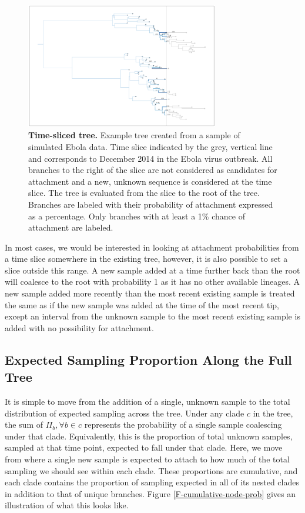 \documentclass[11pt,oneside,letterpaper]{article}
\newcommand\tab[1][1cm]{\hspace*{#1}}
\begin{document}
\begin{figure}[h]
 \centering
	\includegraphics[width=0.75\textwidth]{figures/time-slice}
	\caption{\textbf{Time-sliced tree.}
	Example tree created from a sample of simulated Ebola data. Time slice indicated by the grey, vertical line and corresponds to December 2014 in the Ebola virus outbreak. All branches to the right of the slice are not considered as candidates for attachment and a new, unknown sequence is considered at the time slice. The tree is evaluated from the slice to the root of the tree. Branches are labeled with their probability of attachment expressed as a percentage. Only branches with at least a 1\% chance of attachment are labeled.
	}
	\label{F-time-slice}
\end{figure}

\tab In most cases, we would be interested in looking at attachment probabilities from a time slice somewhere in the existing tree, however, it is also possible to set a slice outside this range. A new sample added at a time further back than the root will coalesce to the root with probability 1 as it has no other available lineages. A new sample added more recently than the most recent existing sample is treated the same as if the new sample was added at the time of the most recent tip, except an interval from the unknown sample to the most recent existing sample is added with no possibility for attachment.

\subsection*{Expected Sampling Proportion Along the Full Tree}
\tab It is simple to move from the addition of a single, unknown sample to the total distribution of expected sampling across the tree. Under any clade  $c$ in the tree, the sum of $\Pi_b, \forall b \in c$ represents the probability of a single sample coalescing under that clade. Equivalently, this is the proportion of total unknown samples, sampled at that time point, expected to fall under that clade. Here, we move from where a single new sample is expected to attach to how much of the total sampling we should see within each clade. These proportions are cumulative, and each clade contains the proportion of sampling expected in all of its nested clades in addition to that of unique branches. Figure \ref{F-cumulative-node-prob} gives an illustration of what this looks like.
\end{document}
